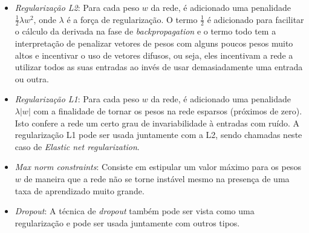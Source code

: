 \begin{itemize}

  \item \emph{Regularização L2}: Para cada peso $w$ da rede, é
    adicionado uma penalidade $\frac{1}{2}\lambda w^2$, onde $\lambda$ é a
    força de regularização. O termo $\frac{1}{2}$ é adicionado para facilitar o
    cálculo da derivada na fase de \emph{backpropagation} e o termo todo tem a
    interpretação de penalizar vetores de pesos com alguns poucos pesos muito
    altos e incentivar o uso de vetores difusos, ou seja, eles incentivam a
    rede a utilizar todos as suas entradas ao invés de usar demasiadamente uma
    entrada ou outra.

  \item \emph{Regularização L1}: Para cada peso $w$ da rede, é adicionado uma
    penalidade $\lambda|w|$ com a finalidade de tornar os pesos na rede
    esparsos (próximos de zero). Isto confere a rede um certo grau de
    invariabilidade à entradas com ruído. A regularização L1 pode ser usada
    juntamente com a L2, sendo chamadas neste caso de \emph{Elastic net
      regularization}.

  \item \emph{Max norm constraints}: Consiste em estipular um valor máximo para
    os pesos $w$ de maneira que a rede não se torne instável mesmo na presença
    de uma taxa de aprendizado muito grande.

  \item \emph{Dropout}: A técnica de \emph{dropout} também pode ser vista como
    uma regularização e pode ser usada juntamente com outros tipos.

\end{itemize}
